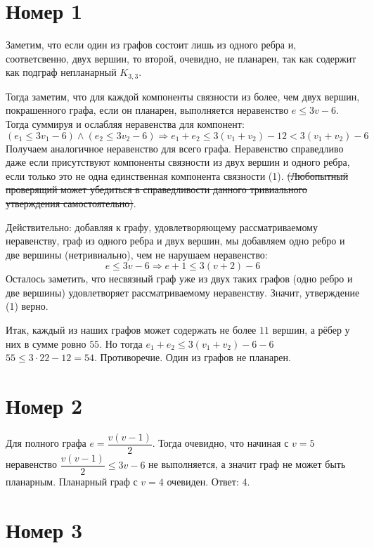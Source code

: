 \documentclass[a4paper,12pt]{article}
\begin{document}
\begin{flushleft}

\section{Номер 1}

Заметим, что если один из графов состоит лишь из одного ребра и, соответсвенно,
двух вершин, то второй, очевидно, не планарен, так как содержит как подграф 
непланарный $K_{3,3}$.

Тогда заметим, что для каждой компоненты связности из более,
чем двух вершин, покрашенного графа, если он планарен, 
выполняется неравенство $e \leq 3v - 6$. Тогда суммируя и ослабляя неравенства
для компонент: 
$$(e_1 \leq 3v_1 - 6) \land (e_2 \leq 3v_2 - 6) \Rightarrow 
e_1 + e_2 \leq 3(v_1 + v_2) - 12 < 3(v_1 + v_2) - 6$$
Получаем аналогичное неравенство для всего графа. Неравенство справедливо даже если присутствуют
компоненты связности из двух вершин и одного ребра, если только это не одна
единственная компонента связности (1). \sout{(Любопытный проверящий может убедиться
в справедливости данного тривиального утверждения самостоятельно)}.

Действительно: добавляя к графу, удовлетворяющему рассматриваемому неравенству,
граф из одного ребра и двух вершин, мы добавляем одно ребро и две вершины 
(нетривиально), чем не нарушаем неравенство: 
$$ e \leq 3v - 6 \Rightarrow e + 1 \leq 3 (v + 2) - 6$$
Осталось заметить, что несвязный граф уже из двух таких графов 
(одно ребро и две вершины) удовлетворяет рассматриваемому неравенству.
Значит, утверждение (1) верно.

Итак, каждый из наших графов может содержать не более $11$ вершин, а 
рёбер у них в сумме ровно $55$. Но тогда $e_1 + e_2 \leq 3 (v_1 + v_2) - 6 - 6$
$55 \leq 3 \cdot 22 - 12 = 54$. Противоречие. Один из графов не планарен.

\section{Номер 2}

Для полного графа $e = \dfrac{v (v - 1)}{2}$. Тогда очевидно, что начиная
с $v = 5$ неравенство $\dfrac{v (v - 1)}{2} \leq 3v - 6$ не выполняется,
а значит граф не может быть планарным. Планарный граф с $v = 4$ очевиден.
Ответ: $4$.

\section{Номер 3}


\end{flushleft}
\end{document}
